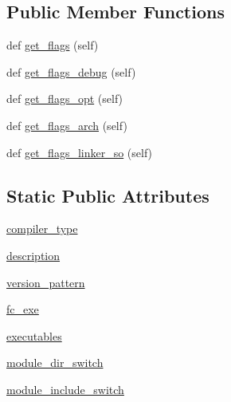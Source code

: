 \subsection*{Public Member Functions}
\begin{DoxyCompactItemize}
\item 
def \hyperlink{classnumpy_1_1distutils_1_1fcompiler_1_1compaq_1_1CompaqFCompiler_a8e0a2a75057c9080f909ea99ddf3f2e8}{get\+\_\+flags} (self)
\item 
def \hyperlink{classnumpy_1_1distutils_1_1fcompiler_1_1compaq_1_1CompaqFCompiler_a412733fd6e4d1bdb74016dcd1f09d8c8}{get\+\_\+flags\+\_\+debug} (self)
\item 
def \hyperlink{classnumpy_1_1distutils_1_1fcompiler_1_1compaq_1_1CompaqFCompiler_a4b5ab28d5296615725bc84f2ed57525f}{get\+\_\+flags\+\_\+opt} (self)
\item 
def \hyperlink{classnumpy_1_1distutils_1_1fcompiler_1_1compaq_1_1CompaqFCompiler_a46cb4e644ad79dcff69e4eebd4dd0990}{get\+\_\+flags\+\_\+arch} (self)
\item 
def \hyperlink{classnumpy_1_1distutils_1_1fcompiler_1_1compaq_1_1CompaqFCompiler_aba5eb67f99a46dc1fde63b8414289531}{get\+\_\+flags\+\_\+linker\+\_\+so} (self)
\end{DoxyCompactItemize}
\subsection*{Static Public Attributes}
\begin{DoxyCompactItemize}
\item 
\hyperlink{classnumpy_1_1distutils_1_1fcompiler_1_1compaq_1_1CompaqFCompiler_aeb71022936b469c3192b45914bb0747d}{compiler\+\_\+type}
\item 
\hyperlink{classnumpy_1_1distutils_1_1fcompiler_1_1compaq_1_1CompaqFCompiler_af828b171d3d041e7ef813d7317380e53}{description}
\item 
\hyperlink{classnumpy_1_1distutils_1_1fcompiler_1_1compaq_1_1CompaqFCompiler_a8b8e6384ea3c1cd3cc6e56b61dacfa65}{version\+\_\+pattern}
\item 
\hyperlink{classnumpy_1_1distutils_1_1fcompiler_1_1compaq_1_1CompaqFCompiler_ac31992d10c61a7811e8709e35836c755}{fc\+\_\+exe}
\item 
\hyperlink{classnumpy_1_1distutils_1_1fcompiler_1_1compaq_1_1CompaqFCompiler_a7fe7215e64ea0b5940b78334e42543cd}{executables}
\item 
\hyperlink{classnumpy_1_1distutils_1_1fcompiler_1_1compaq_1_1CompaqFCompiler_abac062189c06199a6e16675d37619749}{module\+\_\+dir\+\_\+switch}
\item 
\hyperlink{classnumpy_1_1distutils_1_1fcompiler_1_1compaq_1_1CompaqFCompiler_a57677cd3e1ff6b0bdef6681173e8fd0b}{module\+\_\+include\+\_\+switch}
\end{DoxyCompactItemize}


